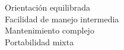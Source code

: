 \documentclass[preview]{standalone}
\begin{document}
Orientación equilibrada\\Facilidad de manejo intermedia\\Mantenimiento complejo\\Portabilidad mixta\\
\end{document}
